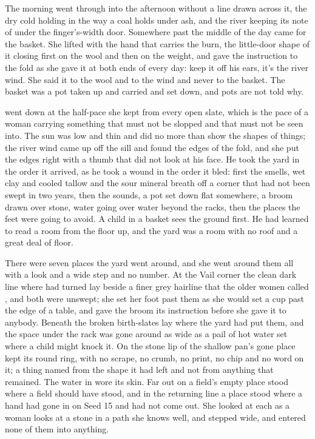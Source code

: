 The morning went through into the afternoon without a line drawn across it, the dry cold holding in  the way a coal holds under ash, and the river keeping its note of  under the finger's-width door. Somewhere past the middle of the day  came for the basket. She lifted with the hand that carries the burn, the little-door shape of it closing first on the wool and then on the weight, and gave the instruction to the fold as she gave it at both ends of every day: keep it off his ears, it's the river wind. She said it to the wool and to the wind and never to the basket. The basket was a pot taken up and carried and set down, and pots are not told why.

 went down at the half-pace she kept from every open slate, which is the pace of a woman carrying something that must not be slopped and that must not be seen into. The sun was low and thin and did no more than show the shapes of things; the river wind came up off the sill and found the edges of the fold, and she put the edges right with a thumb that did not look at his face. He took the yard in the order it arrived, as he took a wound in the order it bled: first the smells, wet clay and cooled tallow and the sour mineral breath off a corner that had not been swept in two years, then the sounds, a pot set down flat somewhere, a broom drawn over stone, water going over water beyond the racks, then the places the feet were going to avoid. A child in a basket sees the ground first. He had learned to read a room from the floor up, and the yard was a room with no roof and a great deal of floor.

There were seven places the yard went around, and she went around them all with a look and a wide step and no number. At the Vail corner the clean dark line where  had turned lay beside a finer grey hairline that the older women called , and both were unswept; she set her foot past them as she would set a cup past the edge of a table, and gave the broom its instruction before she gave it to anybody. Beneath  the broken birth-slates lay where the yard had put them, and the space under the rack was gone around as wide as a pail of hot water set where a child might knock it. On the stone lip of  the shallow pan's gone place kept its round ring, with no scrape, no crumb, no print, no chip and no word on it; a thing named from the shape it had left and not from anything that remained. The water in  wore its skin. Far out on  a field's empty place stood where a field should have stood, and in the returning line a place stood where a hand had gone in on Seed 15 and had not come out. She looked at each as a woman looks at a stone in a path she knows well, and stepped wide, and entered none of them into anything.


